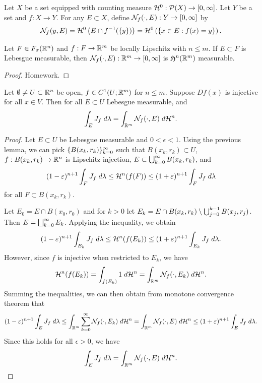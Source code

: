 \documentclass[a4paper]{article}
\begin{document}
\begin{defi}
Let $X$ be a set equipped with counting measure
$\mathcal{H}^0 : \mathcal{P}(X) \to [0, \infty]$. Let $Y$ be a set
and $f: X \to Y$. For any $E \subset X$, define
$\mathcal{N}_f (\cdot, E) : Y \to [0, \infty]$ by
\[
\mathcal{N}_f(y, E) = \mathcal{H}^0 \left( E \cap f^{-1} (\{y\}) \right)
= \mathcal{H}^0 \left( \left\{ x \in E: f(x) = y \right\} \right).
\]
\end{defi}

\begin{thm}
Let $F \in F_\sigma(\mathbb{R}^n)$ and $f: F \to \mathbb{R}^m$ be locally
Lipschitz with $n \leq m$. If $E \subset F$ is Lebesgue
measurable, then $\mathcal{N}_f(\cdot, E) : \mathbb{R}^m \to [0, \infty]$
is $\mathfrak{H}^n(\mathbb{R}^m)$ measurable.
\end{thm}

\begin{proof}
Homework.
\end{proof}

\begin{lemma}
Let $\emptyset \neq U \subset \mathbb{R}^n$ be open, $f \in C^1
(U ; \mathbb{R}^m)$ for $n \leq m$. Suppose $Df(x)$ is injective
for all $x \in V$. Then for all $E \subset U$ Lebesgue
measurable, and
\[
\int_E J_f \; d \lambda = \int_{\mathbb{R}^m} \mathcal{N}_f (\cdot, E) \; d \mathcal{H}^n.
\]
\end{lemma}

\begin{proof}
Let $E \subset U$ be Lebesgue measurable and $0 < \epsilon < 1$.
Using the previous lemma, we can pick $\{ B(x_k, r_k) \}_{k=0}^\infty$
such that $B(x_k, r_k) \subset U$, $f : B(x_k, r_k) \to \mathbb{R}^n$
is Lipschitz injection, $E \subset \bigcup_{k=0}^\infty B(x_k, r_k)$, and
\[
(1 - \varepsilon)^{n+1} \int_F J_f \; d \lambda
\leq \mathcal{H}^n (f(F))
\leq (1 + \varepsilon)^{n+1} \int_F J_f \; d \lambda
\]
for all $F \subset B(x_k, r_k)$.

Let $E_0 = E \cap B(x_0, r_0)$ and for $k > 0$ let
$E_k = E \cap B(x_k, r_k) \setminus \bigcup_{j=0}^{k-1} B(x_j, r_j)$.
Then $E = \bigsqcup_{k=0}^\infty E_k$. Applying the inequality, we obtain
\[
(1 - \varepsilon)^{n+1} \int_{E_k} J_f \; d \lambda
\leq \mathcal{H}^n (f(E_k))
\leq (1 + \varepsilon)^{n+1} \int_{E_k} J_f \; d \lambda.
\]
However, since $f$ is injective when restricted to $E_k$,
we have
\[
\mathcal{H}^n (f(E_k))
= \int_{f(E_k)} 1 \; d \mathcal{H}^n
= \int_{\mathbb{R}^m} \mathcal{N}_f(\cdot, E_k) \; d \mathcal{H}^n.
\]
Summing the inequalities, we can then obtain from monotone
convergence theorem that
\[
(1 - \varepsilon)^{n+1} \int_E J_f \; d \lambda
\leq \int_{\mathbb{R}^m} \sum_{k=0}^\infty \mathcal{N}_f(\cdot, E_k) \; d \mathcal{H}^n
= \int_{\mathbb{R}^m} \mathcal{N}_f(\cdot, E) \; d \mathcal{H}^n
\leq (1 + \varepsilon)^{n+1} \int_E J_f \; d \lambda.
\]
Since this holds for all $\epsilon > 0$, we have
\[
\int_E J_f \; d \lambda = \int_{\mathbb{R}^m} \mathcal{N}_f(\cdot, E) \; d \mathcal{H}^n.
\]
\end{proof}
\end{document}
